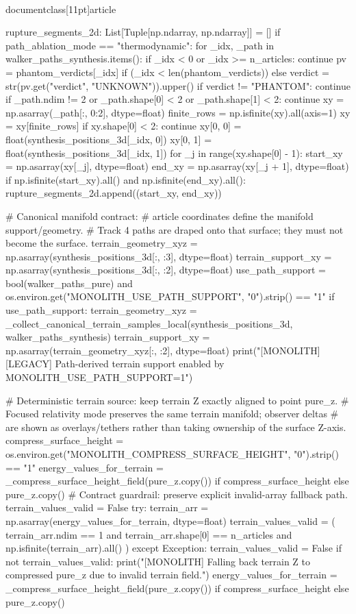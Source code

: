 \\documentclass[11pt]{article}
\begin{document}
\begin{CodeBlock}
{{{{{    rupture_segments_2d: List[Tuple[np.ndarray, np.ndarray]] = []
    if path_ablation_mode == "thermodynamic":
        for _idx, _path in walker_paths_synthesis.items():
            if _idx < 0 or _idx >= n_articles:
                continue
            pv = phantom_verdicts[_idx] if (_idx < len(phantom_verdicts)) else {}
            verdict = str(pv.get("verdict", "UNKNOWN")).upper()
            if verdict != "PHANTOM":
                continue
            if _path.ndim != 2 or _path.shape[0] < 2 or _path.shape[1] < 2:
                continue
            xy = np.asarray(_path[:, 0:2], dtype=float)
            finite_rows = np.isfinite(xy).all(axis=1)
            xy = xy[finite_rows]
            if xy.shape[0] < 2:
                continue
            xy[0, 0] = float(synthesis_positions_3d[_idx, 0])
            xy[0, 1] = float(synthesis_positions_3d[_idx, 1])
            for _j in range(xy.shape[0] - 1):
                start_xy = np.asarray(xy[_j], dtype=float)
                end_xy = np.asarray(xy[_j + 1], dtype=float)
                if np.isfinite(start_xy).all() and np.isfinite(end_xy).all():
                    rupture_segments_2d.append((start_xy, end_xy))

    # Canonical manifold contract:
    # article coordinates define the manifold support/geometry.
    # Track 4 paths are draped onto that surface; they must not become the surface.
    terrain_geometry_xyz = np.asarray(synthesis_positions_3d[:, :3], dtype=float)
    terrain_support_xy = np.asarray(synthesis_positions_3d[:, :2], dtype=float)
    use_path_support = bool(walker_paths_pure) and os.environ.get("MONOLITH_USE_PATH_SUPPORT", "0").strip() == "1"
    if use_path_support:
        terrain_geometry_xyz = _collect_canonical_terrain_samples_local(synthesis_positions_3d, walker_paths_synthesis)
        terrain_support_xy = np.asarray(terrain_geometry_xyz[:, :2], dtype=float)
        print("[MONOLITH][LEGACY] Path-derived terrain support enabled by MONOLITH_USE_PATH_SUPPORT=1")

    # Deterministic terrain source: keep terrain Z exactly aligned to point pure_z.
    # Focused relativity mode preserves the same terrain manifold; observer deltas
    # are shown as overlays/tethers rather than taking ownership of the surface Z-axis.
    compress_surface_height = os.environ.get("MONOLITH_COMPRESS_SURFACE_HEIGHT", "0").strip() == "1"
    energy_values_for_terrain = _compress_surface_height_field(pure_z.copy()) if compress_surface_height else pure_z.copy()
    # Contract guardrail: preserve explicit invalid-array fallback path.
    terrain_values_valid = False
    try:
        terrain_arr = np.asarray(energy_values_for_terrain, dtype=float)
        terrain_values_valid = (
            terrain_arr.ndim == 1
            and terrain_arr.shape[0] == n_articles
            and np.isfinite(terrain_arr).all()
        )
    except Exception:
        terrain_values_valid = False
    if not terrain_values_valid:
        print("[MONOLITH] Falling back terrain Z to compressed pure_z due to invalid terrain field.")
        energy_values_for_terrain = _compress_surface_height_field(pure_z.copy()) if compress_surface_height else pure_z.copy()

}}}}}
\end{CodeBlock}
\end{document}
